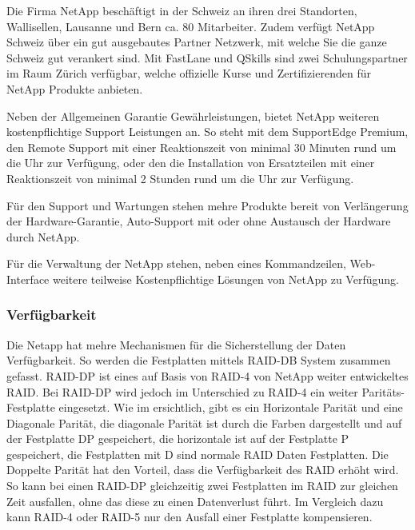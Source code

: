 Die Firma NetApp beschäftigt in der Schweiz an ihren drei Standorten, Wallisellen, Lausanne und Bern ca. 80 Mitarbeiter. Zudem verfügt NetApp Schweiz über ein gut ausgebautes Partner Netzwerk, mit welche Sie die ganze Schweiz gut verankert sind. Mit FastLane und QSkills sind zwei Schulungspartner im Raum Zürich verfügbar, welche offizielle Kurse und Zertifizierenden für NetApp Produkte anbieten. 

Neben der Allgemeinen Garantie Gewährleistungen, bietet NetApp weiteren kostenpflichtige Support Leistungen an. So steht mit dem SupportEdge Premium, den Remote Support mit einer Reaktionszeit von minimal 30 Minuten rund um die Uhr zur Verfügung, oder den die Installation von Ersatzteilen mit einer Reaktionszeit von minimal 2 Stunden rund um die Uhr zur Verfügung. 

Für den Support und Wartungen stehen mehre Produkte bereit von Verlängerung der Hardware-Garantie, Auto-Support mit oder ohne Austausch der Hardware durch NetApp.

Für die Verwaltung der NetApp stehen, neben eines Kommandzeilen, Web-Interface weitere teilweise Kostenpflichtige Lösungen von NetApp zu Verfügung. 

\subsubsection{Verfügbarkeit}
Die Netapp hat mehre Mechanismen für die Sicherstellung der Daten Verfügbarkeit. So werden die Festplatten mittels RAID-DB System zusammen gefasst. RAID-DP ist eines auf Basis von RAID-4 von NetApp weiter entwickeltes RAID. Bei RAID-DP wird jedoch im Unterschied zu RAID-4 ein weiter Paritäts-Festplatte eingesetzt. Wie im  ersichtlich, gibt es ein Horizontale Parität und eine Diagonale Parität, die diagonale Parität ist durch die Farben dargestellt und auf der Festplatte DP gespeichert, die horizontale ist auf der Festplatte P gespeichert, die Festplatten mit D sind normale RAID Daten Festplatten. Die Doppelte Parität hat den Vorteil, dass die Verfügbarkeit des RAID erhöht wird. So kann bei einen RAID-DP gleichzeitig zwei Festplatten im RAID zur gleichen Zeit ausfallen, ohne das diese zu einen Datenverlust führt. Im Vergleich dazu kann RAID-4 oder RAID-5 nur den Ausfall einer Festplatte kompensieren. \cite{White2010}

